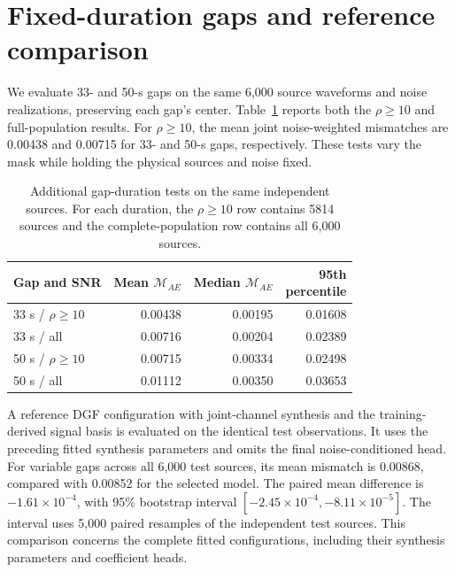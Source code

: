 \documentclass[10pt,prd,aps,a4paper,twocolumn,superscriptaddress,nofootinbib,floatfix]{revtex4-2}
\begin{document}
\section{Fixed-duration gaps and reference comparison}\label{app:fixed_gaps}
We evaluate 33- and 50-s gaps on the same 6,000 source waveforms and noise realizations, preserving each gap's center. Table~\ref{tab:fixed_gaps} reports both the $\rho\ge10$ and full-population results. For $\rho\ge10$, the mean joint noise-weighted mismatches are 0.00438 and 0.00715 for 33- and 50-s gaps, respectively. These tests vary the mask while holding the physical sources and noise fixed.
\begin{table}[t]\centering\setlength{\tabcolsep}{2pt}
\caption{Additional gap-duration tests on the same independent sources. For each duration, the $\rho\ge10$ row contains 5814 sources and the complete-population row contains all 6,000 sources.}\label{tab:fixed_gaps}
\begin{tabular}{lrrr}\hline\hline
Gap and SNR & Mean $\mathcal M_{AE}$ & Median $\mathcal M_{AE}$ & \shortstack{95th\\percentile}\\\hline
33 s / $\rho\ge10$ & 0.00438 & 0.00195 & 0.01608\\
33 s / all & 0.00716 & 0.00204 & 0.02389\\
50 s / $\rho\ge10$ & 0.00715 & 0.00334 & 0.02498\\
50 s / all & 0.01112 & 0.00350 & 0.03653\\
\hline\hline\end{tabular}\end{table}

A reference DGF configuration with joint-channel synthesis and the training-derived signal basis is evaluated on the identical test observations. It uses the preceding fitted synthesis parameters and omits the final noise-conditioned head. For variable gaps across all 6,000 test sources, its mean mismatch is 0.00868, compared with 0.00852 for the selected model. The paired mean difference is $-1.61\times10^{-4}$, with 95\% bootstrap interval $[-2.45\times10^{-4},-8.11\times10^{-5}]$. The interval uses 5,000 paired resamples of the independent test sources. This comparison concerns the complete fitted configurations, including their synthesis parameters and coefficient heads.

\clearpage

\end{document}
